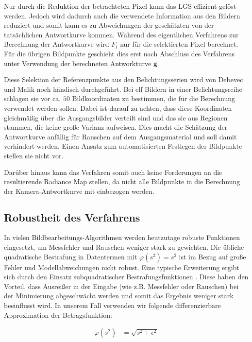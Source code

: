 Nur durch die Reduktion der betrachteten Pixel kann das \gls{LGS} effizient gelöst werden. Jedoch wird dadurch auch die verwendete Information aus den Bildern reduziert und somit kann es zu Abweichungen der geschätzten von der tatsächlichen Antwortkurve kommen. Während des eigentlichen Verfahrens zur Berechnung der Antwortkurve wird $F_i$ nur für die selektierten Pixel berechnet. Für die übrigen Bildpunkte geschieht dies erst nach Abschluss des Verfahrens unter Verwendung der berechneten Antworkturve $\mathbf g$.

Diese Selektion der Referenzpunkte aus den Belichtungsserien wird von Debevec und Malik noch händisch durchgeführt. Bei elf Bildern in einer Belichtungsreihe schlagen sie vor ca. $50$ Bildkoordinaten zu bestimmen, die für die Berechnung verwendet werden sollen. Dabei ist darauf zu achten, dass diese Koordinaten gleichmäßig über die Ausgangsbilder verteilt sind und das sie aus Regionen stammen, die keine große Varianz aufweisen. Dies macht die Schätzung der Antwortkurve anfällig für Rauschen auf dem Ausgangsmaterial und soll damit verhindert werden. Einen Ansatz zum automatisierten Festlegen der Bildpunkte stellen sie nicht vor.

Darüber hinaus kann das Verfahren somit auch keine Forderungen an die resultierende \gls{Radiance Map} stellen, da nicht alle Bildpunkte in die Berechnung der Kamera-Antwortkurve mit einbezogen werden. 

\subsection{Robustheit des Verfahrens}
\label{algo:schwachstellen:robustheit}
In vielen Bildbearbeitungs-Algorithmen werden heutzutage robuste Funktionen eingesetzt, um Messfehler und Rauschen weniger stark zu gewichten. Die übliche quadratische Bestrafung in Datentermen mit $\varphi(s^2) = s^2$ ist im Bezug auf große Fehler und Modellabweichungen nicht robust. Eine typische Erweiterung ergibt sich durch den Einsatz subquadratischer Bestrafungsfunktionen \cite[S. 9f, S. 87f]{bruhn06}. Diese haben den Vorteil, dass Ausreißer in der Eingabe (wie z.B. Messfehler oder Rauschen) bei der Minimierung abgeschwächt werden und somit das Ergebnis weniger stark beeinflusst wird. In unserem Fall verwenden wir folgende differenzierbare Approximation der Betragsfunktion: 

\begin{align}
\label{eq:penalty:non-linear}
\varphi(s^2) &= \sqrt{s^2 + \epsilon^2}
\end{align}

